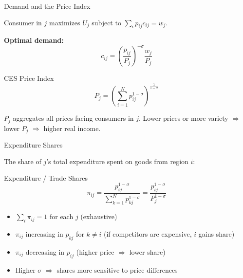\documentclass{beamer}
\begin{document}
\begin{frame}{Demand and the Price Index}

    Consumer in $j$ maximizes $U_j$ subject to $\sum_i p_{ij} c_{ij} = w_j$.

    \vspace{0.3em}
    \textbf{Optimal demand:}
    \[ c_{ij} = \left(\frac{p_{ij}}{P_j}\right)^{-\sigma} \frac{w_j}{P_j} \]

    \begin{block}{CES Price Index}
        \vspace{-0.5em}
        \[ P_j = \left( \sum_{i=1}^{N} p_{ij}^{1-\sigma} \right)^{\frac{1}{1-\sigma}} \]
    \end{block}

    \vspace{0.2em}
     $P_j$ aggregates all prices facing consumers in $j$. Lower prices or more variety $\Rightarrow$ lower $P_j$ $\Rightarrow$ higher real income.

\end{frame}

\begin{frame}{Expenditure Shares}

    The share of $j$'s total expenditure spent on goods from region $i$:

    \vspace{0.3em}
    \begin{block}{Expenditure / Trade Shares}
        \vspace{-0.5em}
        \[ \pi_{ij} = \frac{p_{ij}^{1-\sigma}}{\sum_{k=1}^{N} p_{kj}^{1-\sigma}} = \frac{p_{ij}^{1-\sigma}}{P_j^{1-\sigma}} \]
    \end{block}

    \vspace{0.3em}
    \begin{itemize}
        \item $\sum_{i} \pi_{ij} = 1$ for each $j$ (exhaustive)
        \item $\pi_{ij}$ increasing in $p_{kj}$ for $k \neq i$ (if competitors are expensive, $i$ gains share)
        \item $\pi_{ij}$ decreasing in $p_{ij}$ (higher price $\Rightarrow$ lower share)
        \item Higher $\sigma$ $\Rightarrow$ shares more sensitive to price differences
    \end{itemize}

    \vspace{0.3em}

\end{frame}
\end{document}
